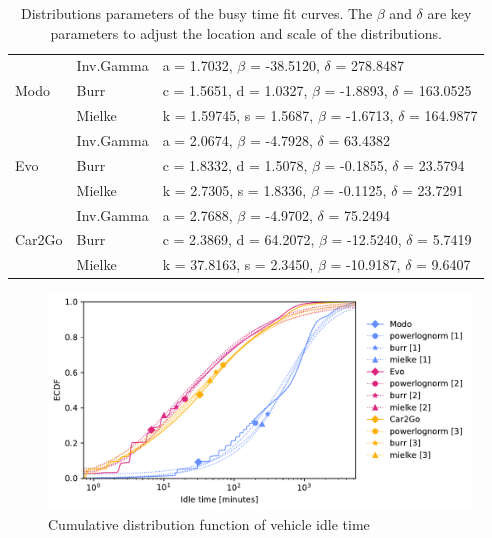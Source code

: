 \begin{table}
\centering
\setlength{\tabcolsep}{2.3pt}
	\begin{tabular}{lll}
	\hline
	\multirow{3}{*}{Modo}   & Inv.Gamma       & a = 1.7032,  $\beta$ = -38.5120,  $\delta$ = 278.8487                        \\
	                        & Burr                & c = 1.5651, d = 1.0327,  $\beta$ = -1.8893, $\delta$ = 163.0525 \\
	                        & Mielke & k = 1.59745, s = 1.5687,  $\beta$ = -1.6713, $\delta$ = 164.9877 \\ \hline
	\multirow{3}{*}{Evo}    & Inv.Gamma       & a = 2.0674, $\beta$ = -4.7928, $\delta$ = 63.4382                          \\
	                        & Burr                & c = 1.8332, d = 1.5078, $\beta$ = -0.1855, $\delta$ = 23.5794   \\
	                        & Mielke & k = 2.7305, s = 1.8336, $\beta$ = -0.1125, $\delta$ = 23.7291 \\ \hline
	\multirow{3}{*}{Car2Go} & Inv.Gamma       & a = 2.7688, $\beta$ = -4.9702, $\delta$ = 75.2494                           \\
	                        & Burr                & c = 2.3869, d = 64.2072, $\beta$ = -12.5240, $\delta$ = 5.7419   \\
	                        & Mielke & k = 37.8163, s = 2.3450, $\beta$ = -10.9187, $\delta$ = 9.6407   \\ \hline
	\end{tabular}
\caption{Distributions parameters of the busy time fit curves. The $\beta$ and $\delta$ are key parameters to adjust the location and scale of the distributions.}
\label{table:fit_busy}
\end{table}

\begin{figure}
   \centering
   \includegraphics[width=0.85\columnwidth]{images_test/CDF_Fit_idle_final.pdf}
   \caption{Cumulative distribution function of vehicle idle time}
   \label{fig:4_4_idle_all_eCDF}
\end{figure}


